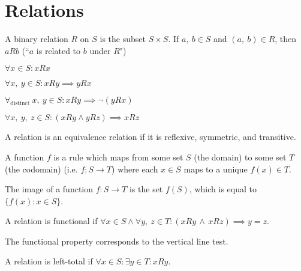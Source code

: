 \documentclass{article}
\begin{document}
\section{Relations}
\begin{definition}
    A binary relation $R$ on $S$ is the subset $S\times S$.
    If $a, \: b \in S$ and  $(a, \: b) \in R$,
    then $aRb$ (``$a$ is related to $b$ under $R$")
\end{definition}
%
\begin{tcolorboxlarge}[title={Relation Properties}]
    \begin{description}[style=sameline]
        \item[Reflexive]
            $\forall x \in S : xRx$
        \item[Symmetric]
            $\forall x,\: y \in S : xRy \implies yRx$
        \item[Antisymmetric]
            $\forall_\text{distinct} \: x,\: y \in S : xRy \implies \neg (yRx)$
        \item[Transitive]
            $\forall x,\: y, \: z \in S : (xRy \land yRz) \implies xRz$
    \end{description}
    \begin{definition}
        A relation is an equivalence relation if it is
        reflexive, symmetric, and transitive.
    \end{definition}
\end{tcolorboxlarge}
%
\begin{definition}
    A function $f$ is a rule which maps
    from some set $S$ (the domain)
    to some set $T$ (the codomain)
    (i.e. $f: S \to T$) where each $x \in S$ maps to a unique $f(x) \in T$.
\end{definition}
\begin{definition}[Image]
    The image of a function $f: S \to T$ is the set $f(S)$,
    which is equal to $\{f(x):x \in S\}$.
\end{definition}
\begin{definition}[Functional]
    A relation is functional if
    $\forall x \in S \land \forall y,\: z \in T
        : (xRy \, \land \, xRz) \implies y=z$.
\end{definition}
\begin{note}
    The functional property corresponds to the vertical line test.
\end{note}
\begin{definition}
    A relation is left-total if
    $\forall x \in S : \exists y \in T : xRy$.
\end{definition}
\end{document}
